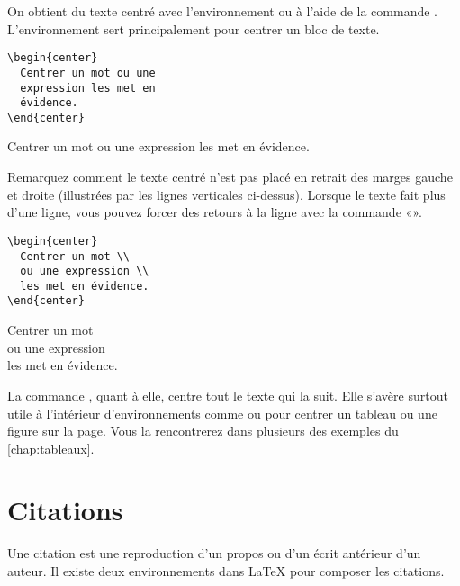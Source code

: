 On obtient du texte centré avec l'environnement  ou à
l'aide de la commande \cmd{\centering}. L'environnement sert
principalement pour centrer un bloc de texte.
\begin{demo}
  \begin{eqxample}
\begin{lstlisting}
\begin{center}
  Centrer un mot ou une
  expression les met en
  évidence.
\end{center}
\end{lstlisting}
    \producing
\begin{center}
  Centrer un mot ou une expression
  les met en évidence.
\end{center}
  \end{eqxample}
\end{demo}
Remarquez comment le texte centré n'est pas placé en retrait des
marges gauche et droite (illustrées par les lignes verticales
ci-dessus). Lorsque le texte fait plus d'une ligne, vous pouvez forcer
des retours à la ligne avec la commande «\pixbsbs».
\begin{demo}
  \begin{eqxample}
\begin{lstlisting}
\begin{center}
  Centrer un mot \\
  ou une expression \\
  les met en évidence.
\end{center}
\end{lstlisting}
    \producing
\begin{center}
  Centrer un mot \\
  ou une expression \\
  les met en évidence.
\end{center}
  \end{eqxample}
\end{demo}

La commande \cmd{\centering}, quant à elle, centre tout le texte qui
la suit. Elle s'avère surtout utile à l'intérieur d'environnements
comme  ou  pour centrer un tableau ou une figure
sur la page. Vous la rencontrerez dans plusieurs des exemples du
\autoref{chap:tableaux}.


\section{Citations}
\label{sec:apparence:citations}

Une citation est une reproduction d'un propos ou d'un écrit antérieur
d'un auteur. Il existe deux environnements dans {\LaTeX} pour composer
les citations.

